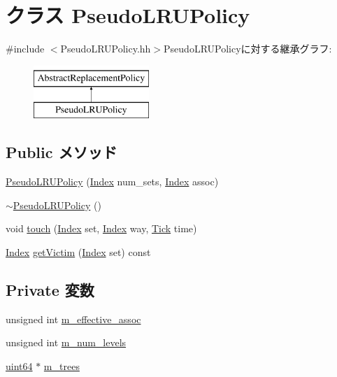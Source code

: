 \hypertarget{classPseudoLRUPolicy}{
\section{クラス PseudoLRUPolicy}
\label{classPseudoLRUPolicy}
}


{\ttfamily \#include $<$PseudoLRUPolicy.hh$>$}PseudoLRUPolicyに対する継承グラフ:\begin{figure}[H]
\begin{center}
\leavevmode
\includegraphics[height=2cm]{classPseudoLRUPolicy}
\end{center}
\end{figure}
\subsection*{Public メソッド}
\begin{DoxyCompactItemize}
\item 
\hyperlink{classPseudoLRUPolicy_a586be6f6d9e79f655d6166c91088204d}{PseudoLRUPolicy} (\hyperlink{TypeDefines_8hh_a39642de41f3574937f399f4fab25ba18}{Index} num\_\-sets, \hyperlink{TypeDefines_8hh_a39642de41f3574937f399f4fab25ba18}{Index} assoc)
\item 
\hyperlink{classPseudoLRUPolicy_a46c39a4b2f695e5fdc2d31a75e579d98}{$\sim$PseudoLRUPolicy} ()
\item 
void \hyperlink{classPseudoLRUPolicy_a6d3ff52feacdaba90c7c0bfbe9f7f58a}{touch} (\hyperlink{TypeDefines_8hh_a39642de41f3574937f399f4fab25ba18}{Index} set, \hyperlink{TypeDefines_8hh_a39642de41f3574937f399f4fab25ba18}{Index} way, \hyperlink{base_2types_8hh_a5c8ed81b7d238c9083e1037ba6d61643}{Tick} time)
\item 
\hyperlink{TypeDefines_8hh_a39642de41f3574937f399f4fab25ba18}{Index} \hyperlink{classPseudoLRUPolicy_aad2c302009bdae8c2f86d7c4e0ed2c8f}{getVictim} (\hyperlink{TypeDefines_8hh_a39642de41f3574937f399f4fab25ba18}{Index} set) const 
\end{DoxyCompactItemize}
\subsection*{Private 変数}
\begin{DoxyCompactItemize}
\item 
unsigned int \hyperlink{classPseudoLRUPolicy_a7715ac656545d5c327a5bbe21e48e4c1}{m\_\-effective\_\-assoc}
\item 
unsigned int \hyperlink{classPseudoLRUPolicy_a27b35e9f12570ea06bb2a060bba1ff6b}{m\_\-num\_\-levels}
\item 
\hyperlink{TypeDefines_8hh_a29940ae63ec06c9998bba873e25407ad}{uint64} $\ast$ \hyperlink{classPseudoLRUPolicy_ac97202b70d0180f4854d13627ce86978}{m\_\-trees}
\end{DoxyCompactItemize}


